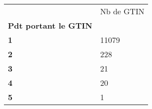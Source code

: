 \begin{tabularx}{\linewidth}{lX}
\toprule
{} &  Nb de GTIN \\
\textbf{Pdt portant le GTIN} &             \\
\midrule
\textbf{1                  } &       11079 \\
\textbf{2                  } &         228 \\
\textbf{3                  } &          21 \\
\textbf{4                  } &          20 \\
\textbf{5                  } &           1 \\
\bottomrule
\end{tabularx}
